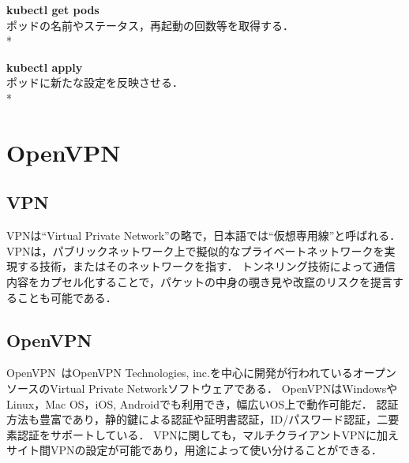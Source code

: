 {\bf kubectl get pods}\\
ポッドの名前やステータス，再起動の回数等を取得する．\\*

{\bf kubectl apply}\\
ポッドに新たな設定を反映させる．\\*

\section{OpenVPN}
\label{background:openvpn}

\subsection{VPN}

VPNは``Virtual Private Network''の略で，日本語では``仮想専用線''と呼ばれる．
VPNは，パブリックネットワーク上で擬似的なプライベートネットワークを実現する技術，またはそのネットワークを指す．
トンネリング技術によって通信内容をカプセル化することで，パケットの中身の覗き見や改竄のリスクを提言することも可能である．

\subsection{OpenVPN}

OpenVPN~\cite{OpenVPN}はOpenVPN Technologies, inc.を中心に開発が行われているオープンソースのVirtual Private Networkソフトウェアである．
OpenVPNはWindowsやLinux，Mac OS，iOS, Androidでも利用でき，幅広いOS上で動作可能だ．
認証方法も豊富であり，静的鍵による認証や証明書認証，ID/パスワード認証，二要素認証をサポートしている．
VPNに関しても，マルチクライアントVPNに加えサイト間VPNの設定が可能であり，用途によって使い分けることができる．